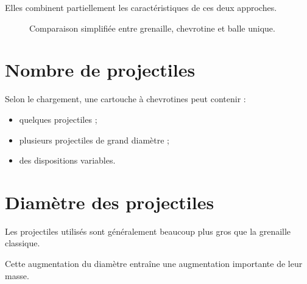 Elles combinent partiellement les caractéristiques de ces deux approches.

\begin{figure}[htbp]
\centering


\caption{Comparaison simplifiée entre grenaille, chevrotine et balle unique.}
\label{fig:grenaille_chevrotine_balle}

\end{figure}

\section{Nombre de projectiles}

Selon le chargement, une cartouche à chevrotines peut contenir :

\begin{itemize}
    \item quelques projectiles ;
    \item plusieurs projectiles de grand diamètre ;
    \item des dispositions variables.
\end{itemize}

\section{Diamètre des projectiles}

Les projectiles utilisés sont généralement beaucoup plus gros que la grenaille
classique.

Cette augmentation du diamètre entraîne une augmentation importante de leur
masse.

